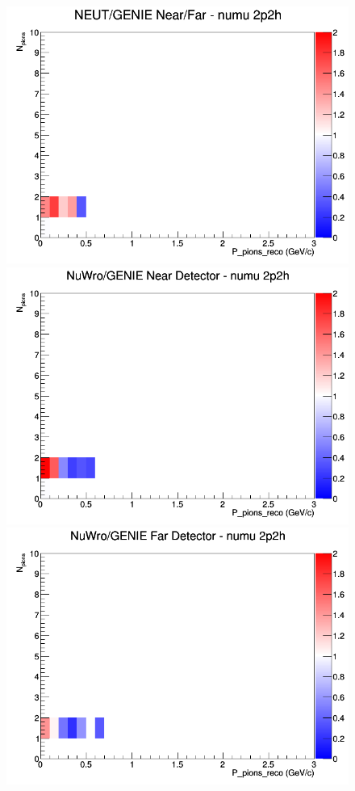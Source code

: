 \documentclass[12pt]{article}
\begin{document}
\begin{figure}[h]
\endminipage
{}
\includegraphics[width=\linewidth]{eff_N_P/LAr/pions/ratios/2p2h_NEUT_GENIE_numu_NF_N_P.png}
\endminipage
\newline
{}
\includegraphics[width=\linewidth]{eff_N_P/LAr/pions/ratios/2p2h_NuWro_GENIE_numu_near_N_P.png}
\endminipage
{}
\includegraphics[width=\linewidth]{eff_N_P/LAr/pions/ratios/2p2h_NuWro_GENIE_numu_far_N_P.png}

\end{figure}
\end{document}
